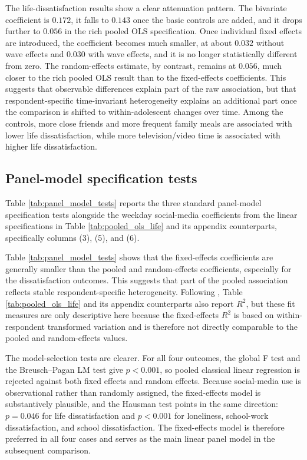 \documentclass[11pt,oneside,a4paper]{book}
\begin{document}
The life-dissatisfaction results show a clear attenuation pattern. The bivariate coefficient is \(0.172\), it falls to \(0.143\) once the basic controls are added, and it drops further to \(0.056\) in the rich pooled OLS specification. Once individual fixed effects are introduced, the coefficient becomes much smaller, at about \(0.032\) without wave effects and \(0.030\) with wave effects, and it is no longer statistically different from zero. The random-effects estimate, by contrast, remains at \(0.056\), much closer to the rich pooled OLS result than to the fixed-effects coefficients. This suggests that observable differences explain part of the raw association, but that respondent-specific time-invariant heterogeneity explains an additional part once the comparison is shifted to within-adolescent changes over time. Among the controls, more close friends and more frequent family meals are associated with lower life dissatisfaction, while more television/video time is associated with higher life dissatisfaction.

\subsection[Panel-Model Specification Tests]{Panel-model specification tests}

Table \ref{tab:panel_model_tests} reports the three standard panel-model specification tests alongside the weekday social-media coefficients from the linear specifications in Table \ref{tab:pooled_ols_life} and its appendix counterparts, specifically columns (3), (5), and (6).



Table \ref{tab:panel_model_tests} shows that the fixed-effects coefficients are generally smaller than the pooled and random-effects coefficients, especially for the dissatisfaction outcomes. This suggests that part of the pooled association reflects stable respondent-specific heterogeneity. Following \citet{ward1993pooled}, Table \ref{tab:pooled_ols_life} and its appendix counterparts also report \(R^2\), but these fit measures are only descriptive here because the fixed-effects \(R^2\) is based on within-respondent transformed variation and is therefore not directly comparable to the pooled and random-effects values.

The model-selection tests are clearer. For all four outcomes, the global F test and the Breusch--Pagan LM test give \(p < 0.001\), so pooled classical linear regression is rejected against both fixed effects and random effects. Because social-media use is observational rather than randomly assigned, the fixed-effects model is substantively plausible, and the Hausman test points in the same direction: \(p = 0.046\) for life dissatisfaction and \(p < 0.001\) for loneliness, school-work dissatisfaction, and school dissatisfaction. The fixed-effects model is therefore preferred in all four cases and serves as the main linear panel model in the subsequent comparison.
\end{document}
